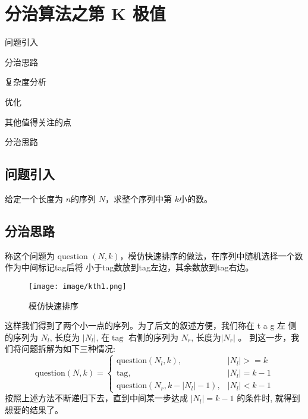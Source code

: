 \chapter{分治算法之第 K 极值}
\begin{introduction}
	\item 问题引入
	\item 分治思路
	\item 复杂度分析
	\item 优化
	\item 其他值得关注的点
	\item 分治思路
	
\end{introduction}
\section{问题引入}
给定一个长度为 $n$的序列 $N$，求整个序列中第 $k$小的数。
\section{分治思路}
称这个问题为$\text { question }(N, k)$，模仿快速排序的做法，在序列中随机选择一个数作为中间标记tag后将
小于tag数放到tag左边，其余数放到tag右边。
\begin{figure}[h]
	\begin{minipage}[t]{1\linewidth}
		\centering
		\texttt{[image: image/kth1.png]}
		\caption{模仿快速排序}
	\end{minipage}
\end{figure}
这样我们得到了两个小一点的序列。为了后文的叙述方便，我们称在  t a g  左 侧的序列为  $N_{l}$,  长度为  $\left|N_{l}\right|$,  在$ \operatorname{tag}$ 右侧的序列为 $N_{r}$,  长度为$  \left|N_{r}\right|$ 。
到这一步，我们将问题拆解为如下三种情况:
$$
\text {question}(N, k)=\left\{\begin{aligned}
\text {question}\left(N_{l}, k\right) ,&\left|N_{l}\right|>=k \\
\text {tag} ,&\left|N_{l}\right|=k-1 \\
\text {question}\left(N_{r}, k-\left|N_{l}\right|-1\right) ,&\left|N_{l}\right|<k-1
\end{aligned}\right.
$$
按照上述方法不断递归下去，直到中间某一步达成 $ \left|N_{l}\right|=k-1$  的条件时, 就得到想要的结果了。
